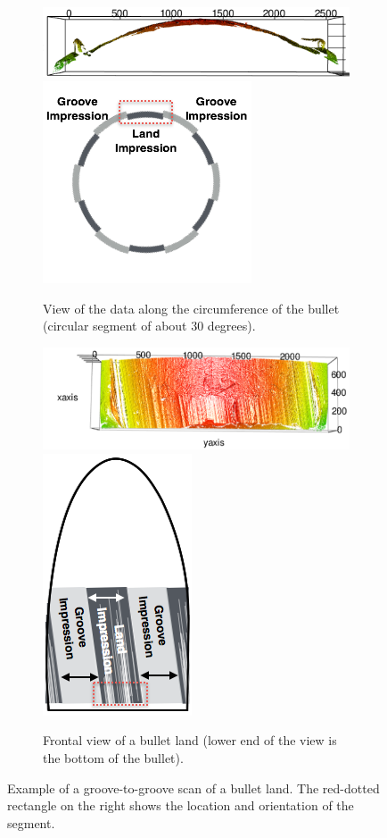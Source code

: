 \documentclass[aoas, preprint]{imsart}\usepackage[]{graphicx}\usepackage[]{color}
\begin{document}
\begin{figure}[hbtp]
  \centering
\begin{subfigure}[t]{\textwidth}\centering
\caption{View of the data along the circumference of the bullet (circular segment of about 30 degrees).\label{fig:sidex3p}}{%
      \includegraphics[width=.65\textwidth]{images/sidex3p.png}
      \hspace{1cm}
      \includegraphics[width=.25\textwidth]{images/side-sketch.png}
    }
\end{subfigure}    
\begin{subfigure}[t]{\textwidth}\centering
    \caption{Frontal view of a bullet land (lower end of the view is the bottom of the bullet). \label{fig:topx3p}}{%
    \includegraphics[width=.65\textwidth]{images/topx3p.png} \hspace{1cm}
    \includegraphics[width=.15\textwidth]{images/top-sketch.png}
    }
\end{subfigure}
\caption{Example of a groove-to-groove scan of a bullet land. The red-dotted rectangle on the right shows the location and orientation of the segment. }
\end{figure}
\end{document}
